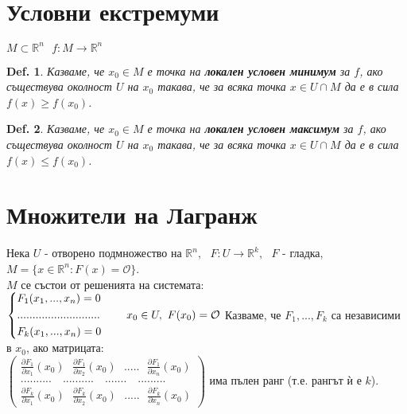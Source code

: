 \documentclass[12pt]{article}
\newtheorem{definition}{Def.}
\newcommand{\spc}{\text{ }}
\begin{document}
	\section*{Условни екстремуми}
	$M\subset \mathbb{R}^n \spc f:M\rightarrow \mathbb{R}^n$\\
	\begin{definition}
		Казваме, че $x_0\in M$ е точка на \textbf{локален условен минимум} за $f$, ако съществува околност $U$ на $x_0$ такава, че за всяка точка $x\in U\cap M$ да е в сила $f(x)\geq f(x_0)$.
	\end{definition}
	\begin{definition}
		Казваме, че $x_0\in M$ е точка на \textbf{локален условен максимум} за $f$, ако съществува околност $U$ на $x_0$ такава, че за всяка точка $x\in U\cap M$ да е в сила $f(x)\leq f(x_0)$.
	\end{definition}

	
	\section*{Множители на Лагранж}
	
	Нека $U$ - отворено подмножество на $\mathbb{R}^n, \spc F:U\rightarrow \mathbb{R}^k, \spc F$ - гладка, $M=\{x\in\mathbb{R}^n:F(x)=\mathcal{O}\}$. \\
	$M$ се състои от решенията на системата:
	\begin{math}
	\begin{cases*}
		F_1(x_1,...,x_n) = 0\\
		...........................\\
		F_k(x_1,...,x_n) = 0\\
	\end{cases*} \quad\quad x_0\in U,\spc F(x_0)=\mathcal{O}\\
	\end{math}
	Казваме, че $F_1,...,F_k$ са независими в $x_0$, ако матрицата:\\
	\begin{math}
	\begin{pmatrix}
		\frac{\partial F_1}{\partial x_1}(x_0)
		\spc
		\frac{\partial F_1}{\partial x_2}(x_0)
		\spc ..... \spc
		\frac{\partial F_1}{\partial x_n}(x_0)
		\\
		..........\quad..........\quad.......\quad.........
		\\
		\frac{\partial F_k}{\partial x_1}(x_0)
		\spc
		\frac{\partial F_k}{\partial x_2}(x_0)
		\spc ..... \spc
		\frac{\partial F_k}{\partial x_n}(x_0)
	\end{pmatrix}
	\end{math}
	има пълен ранг (т.е. рангът ѝ е $k$).
	
\end{document}
